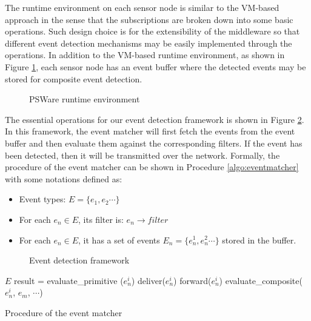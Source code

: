 The runtime environment on each sensor node is similar to the VM-based approach \cite{mate} in the sense that the subscriptions are broken down into some basic operations. Such design choice is for the extensibility of the middleware so that different event detection mechanisms may be easily implemented through the operations. In addition to the VM-based runtime environment, as shown in Figure \ref{fig:pswarevm}, each sensor node has an event buffer where the detected events may be stored for composite event detection.

\begin{figure}
\centering
{}
\caption{PSWare runtime environment}
\label{fig:pswarevm}
\end{figure}

The essential operations for our event detection framework is shown in Figure \ref{fig:eventdetectionframework2}. In this framework, the event matcher will first fetch the events from the event buffer and then evaluate them against the corresponding filters. If the event has been detected, then it will be transmitted over the network. Formally, the procedure of the event matcher can be shown in Procedure \ref{algo:eventmatcher} with some notations defined as:
\begin{itemize}
\item Event types: \(E=\{e_1, e_2 \cdots \}\)
\item For each \(e_n\in E\), its filter is: \(e_n\rightarrow filter\)
\item For each \(e_n\in E\), it has a set of events \(E_n=\{e_n^1, e_n^2 \cdots \}\) stored in the buffer.
\end{itemize}

\begin{figure}
\centering
{}
\caption{Event detection framework}
\label{fig:eventdetectionframework2}
\end{figure}

\begin{algorithm}
\begin{algorithmic}
\REQUIRE \(E\)
				\STATE result = evaluate\_primitive (\(e_n^i\))
						\STATE deliver(\(e_n^i\))
					\ELSE
						\STATE forward(\(e_n^i\))
					\ENDIF
				\ENDIF
			\ELSE
					\STATE evaluate\_composite(\(e_n^i\), \(e_m\), \(\cdots \))
				\ENDFOR
			\ENDIF
		\ENDFOR
	\ENDFOR
\end{algorithmic}
\caption{Procedure of the event matcher}
\label{algo:eventmatcher}
\end{algorithm}

